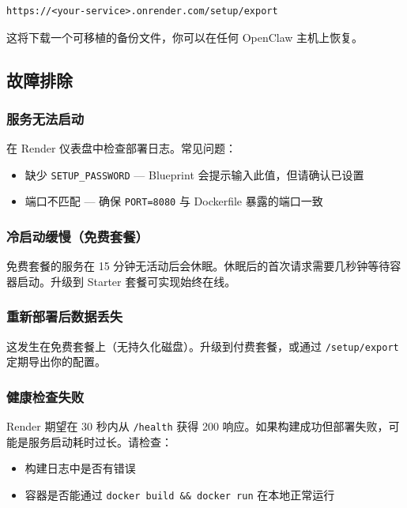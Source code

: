 \begin{lstlisting}
https://<your-service>.onrender.com/setup/export
\end{lstlisting}


这将下载一个可移植的备份文件，你可以在任何 OpenClaw 主机上恢复。

\subsection{故障排除}


\subsubsection{服务无法启动}


在 Render 仪表盘中检查部署日志。常见问题：

\begin{itemize}
  \item 缺少 \texttt{SETUP\_PASSWORD} — Blueprint 会提示输入此值，但请确认已设置
  \item 端口不匹配 — 确保 \texttt{PORT=8080} 与 Dockerfile 暴露的端口一致
\end{itemize}


\subsubsection{冷启动缓慢（免费套餐）}


免费套餐的服务在 15 分钟无活动后会休眠。休眠后的首次请求需要几秒钟等待容器启动。升级到 Starter 套餐可实现始终在线。

\subsubsection{重新部署后数据丢失}


这发生在免费套餐上（无持久化磁盘）。升级到付费套餐，或通过 \texttt{/setup/export} 定期导出你的配置。

\subsubsection{健康检查失败}


Render 期望在 30 秒内从 \texttt{/health} 获得 200 响应。如果构建成功但部署失败，可能是服务启动耗时过长。请检查：

\begin{itemize}
  \item 构建日志中是否有错误
  \item 容器是否能通过 \texttt{docker build \&\& docker run} 在本地正常运行
\end{itemize}



